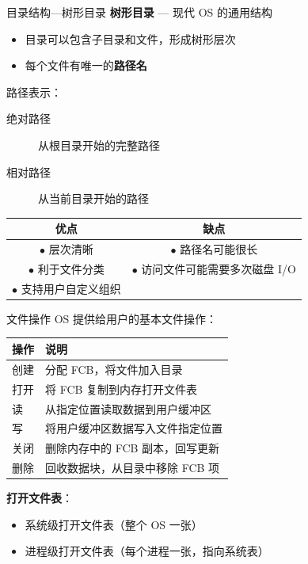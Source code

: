 \documentclass[10pt, aspectratio=169]{beamer}
\begin{document}
\begin{frame}{目录结构---树形目录}
    \textbf{树形目录} --- 现代 OS 的通用结构
    \begin{itemize}
        \item 目录可以包含子目录和文件，形成树形层次
        \item 每个文件有唯一的\textbf{路径名}
    \end{itemize}
    \vspace{0.5em}
    路径表示：
    \begin{description}
        \item[绝对路径] 从根目录开始的完整路径
        \item[相对路径] 从当前目录开始的路径
    \end{description}
    \vspace{0.5em}
    \begin{center}
        \begin{tabular}{|c|c|}
            \hline
            \textbf{优点} & \textbf{缺点} \\
            \hline
            $\bullet$ 层次清晰 & $\bullet$ 路径名可能很长 \\
            $\bullet$ 利于文件分类 & $\bullet$ 访问文件可能需要多次磁盘 I/O \\
            $\bullet$ 支持用户自定义组织 & \\
            \hline
        \end{tabular}
    \end{center}
\end{frame}

\begin{frame}{文件操作}
    OS 提供给用户的基本文件操作：
    \vspace{0.5em}
    \begin{center}
        \begin{tabular}{|l|l|}
            \hline
            \textbf{操作} & \textbf{说明} \\
            \hline
            创建 & 分配 FCB，将文件加入目录 \\
            打开 & 将 FCB 复制到内存打开文件表 \\
            读 & 从指定位置读取数据到用户缓冲区 \\
            写 & 将用户缓冲区数据写入文件指定位置 \\
            关闭 & 删除内存中的 FCB 副本，回写更新 \\
            删除 & 回收数据块，从目录中移除 FCB 项 \\
            \hline
        \end{tabular}
    \end{center}
    \vspace{0.5em}
    \textbf{打开文件表}：
    \begin{itemize}
        \item 系统级打开文件表（整个 OS 一张）
        \item 进程级打开文件表（每个进程一张，指向系统表）
    \end{itemize}
\end{frame}
\end{document}
